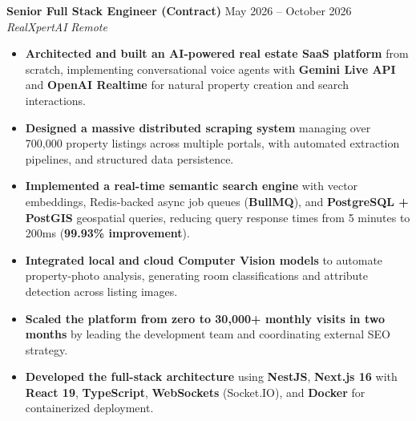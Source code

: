 \documentclass[11pt]{article}
\begin{document}
\textbf{Senior Full Stack Engineer (Contract)} \hfill May 2026 – October 2026 \\
\textit{RealXpertAI} \hfill \textit{Remote}
\begin{itemize}[noitemsep, topsep=1pt, leftmargin=15pt]
    \item \textbf{Architected and built an AI-powered real estate SaaS platform} from scratch, implementing conversational voice agents with \textbf{Gemini Live API} and \textbf{OpenAI Realtime} for natural property creation and search interactions.
    \item \textbf{Designed a massive distributed scraping system} managing over 700,000 property listings across multiple portals, with automated extraction pipelines, and structured data persistence.
    \item \textbf{Implemented a real-time semantic search engine} with vector embeddings, Redis-backed async job queues (\textbf{BullMQ}), and \textbf{PostgreSQL + PostGIS} geospatial queries, reducing query response times from 5 minutes to 200ms (\textbf{99.93\% improvement}).
    \item \textbf{Integrated local and cloud Computer Vision models} to automate property-photo analysis, generating room classifications and attribute detection across listing images.
    \item \textbf{Scaled the platform from zero to 30,000+ monthly visits in two months} by leading the development team and coordinating external SEO strategy.
    \item \textbf{Developed the full-stack architecture} using \textbf{NestJS}, \textbf{Next.js 16} with \textbf{React 19}, \textbf{TypeScript}, \textbf{WebSockets} (Socket.IO), and \textbf{Docker} for containerized deployment.
\end{itemize}

\vspace{4pt}
\end{document}
